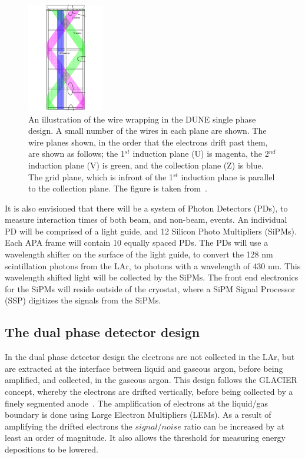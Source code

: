 \begin{figure}
  \centering
  \includegraphics[width=0.3\textwidth]{tpc_apa_cross_sections}
  \caption[An illustration of the wire wrapping in the DUNE single phase design]
          {An illustration of the wire wrapping in the DUNE single phase design. A small number of the wires in each plane are shown. The wire planes shown, in the order that the electrons drift past them, are shown as follows; the 1$^{st}$ induction plane (U) is magenta, the 2$^{nd}$ induction plane (V) is green, and the collection plane (Z) is blue. The grid plane, which is infront of the 1$^{st}$ induction plane is parallel to the collection plane. The figure is taken from~\citep{DUNECDR_V4}.}  
  \label{fig:35tonWireGeom}
\end{figure}

It is also envisioned that there will be a system of Photon Detectors (PDs), to measure interaction times of both beam, and non-beam, events. An individual PD will be comprised of a light guide, and 12 Silicon Photo Multipliers (SiPMs). Each APA frame will contain 10 equally spaced PDs. The PDs will use a wavelength shifter on the surface of the light guide, to convert the 128 nm scintillation photons from the LAr, to photons with a wavelength of 430 nm. This wavelength shifted light will be collected by the SiPMs. The front end electronics for the SiPMs will reside outside of the cryostat, where a SiPM Signal Processor (SSP) digitizes the signals from the SiPMs. \\

\subsection{The dual phase detector design} \label{sec:DUNEDetector_DP}
In the dual phase detector design the electrons are not collected in the LAr, but are extracted at the interface between liquid and gaseous argon, before being amplified, and collected, in the gaseous argon. This design follows the GLACIER concept\citep{GLACIER}, whereby the electrons are drifted vertically, before being collected by a finely segmented anode~\citep{1748-0221-8-04-P04012, 1748-0221-7-08-P08026, Badertscher:2010zg}. The amplification of electrons at the liquid/gas boundary is done using Large Electron Multipliers (LEMs). As a result of amplifying the drifted electrons the $signal/noise$ ratio can be increased by at least an order of magnitude. It also allows the threshold for measuring energy depositions to be lowered. \\


